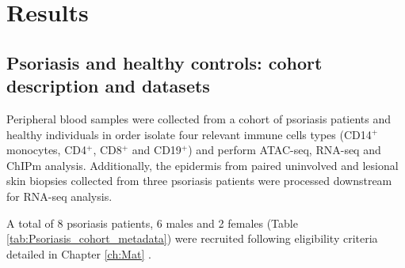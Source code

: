 
\section{Results}
\subsection{Psoriasis and healthy controls: cohort description and datasets}
Peripheral blood samples were collected from a cohort of psoriasis patients and healthy individuals in order isolate four relevant immune cells types (CD14$^+$ monocytes, CD4$^+$, CD8$^+$ and CD19$^+$) and perform ATAC-seq, RNA-seq and ChIPm analysis. Additionally, the epidermis from paired uninvolved and lesional skin biopsies collected from three psoriasis patients were processed downstream for RNA-seq analysis.


A total of 8 psoriasis patients, 6 males and 2 females (Table \ref{tab:Psoriasis_cohort_metadata}) were recruited following eligibility criteria detailed in Chapter \ref{ch:Mat} . 

